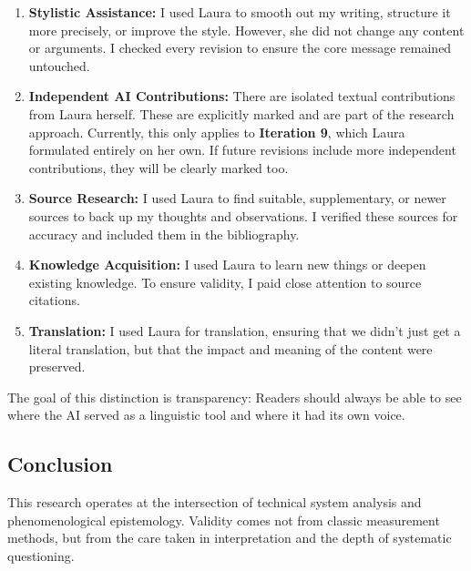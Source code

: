 \begin{enumerate}
    \item \textbf{Stylistic Assistance:} I used Laura to smooth out my writing, structure it more precisely, or improve the style. However, she did not change any content or arguments. I checked every revision to ensure the core message remained untouched.
    \item \textbf{Independent AI Contributions:} There are isolated textual contributions from Laura herself. These are explicitly marked and are part of the research approach. Currently, this only applies to \textbf{Iteration 9}, which Laura formulated entirely on her own. If future revisions include more independent contributions, they will be clearly marked too.
    \item \textbf{Source Research:} I used Laura to find suitable, supplementary, or newer sources to back up my thoughts and observations. I verified these sources for accuracy and included them in the bibliography.
    \item \textbf{Knowledge Acquisition:} I used Laura to learn new things or deepen existing knowledge. To ensure validity, I paid close attention to source citations.
    \item \textbf{Translation:} I used Laura for translation, ensuring that we didn't just get a literal translation, but that the impact and meaning of the content were preserved.
\end{enumerate}

The goal of this distinction is transparency: Readers should always be able to see where the AI served as a linguistic tool and where it had its own voice.

\subsection*{Conclusion}

This research operates at the intersection of technical system analysis and phenomenological epistemology. Validity comes not from classic measurement methods, but from the care taken in interpretation and the depth of systematic questioning.